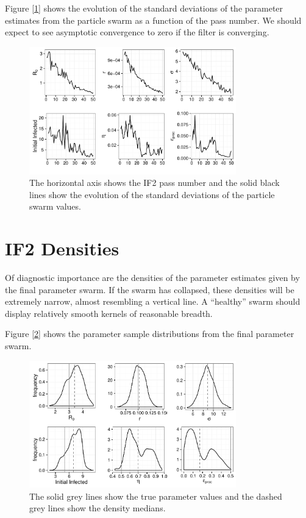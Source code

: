    Figure [\ref{if2sdconvergence}] shows the evolution of the standard deviations of the parameter estimates from the particle swarm as a function of the pass number. We should expect to see asymptotic convergence to zero if the filter is converging.

    \begin{figure}
        \centering
        \captionsetup{width=.8\linewidth}
        \includegraphics[width=0.8\textwidth]{./images/if2sdconvergence.pdf}
        \caption{The horizontal axis shows the IF2 pass number and the solid black lines show the evolution of the standard deviations of the particle swarm values. \label{if2sdconvergence}}
    \end{figure}


\section{IF2 Densities}

	Of diagnostic importance are the densities of the parameter estimates given by the final parameter swarm. If the swarm has collapsed, these densities will be extremely narrow, almost resembling a vertical line. A ``healthy'' swarm should display relatively smooth kernels of reasonable breadth.

	Figure [\ref{sc1if2kernels}] shows the parameter sample distributions from the final parameter swarm.

	\begin{figure}
        \centering
        \captionsetup{width=.8\linewidth}
        \includegraphics[width=0.8\textwidth]{./images/if2kernels.pdf}
        \caption{The solid grey lines show the true parameter values and the dashed grey lines show the density medians. \label{sc1if2kernels}}
    \end{figure}

